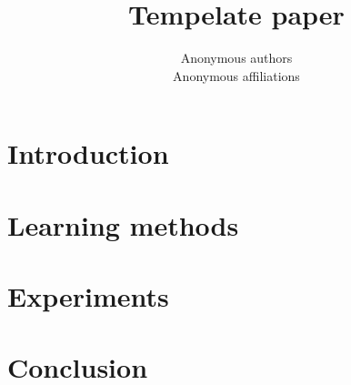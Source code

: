 \documentclass{article}
\title{Tempelate paper}
\author{%
	Anonymous authors \\
	Anonymous affiliations
}
\begin{document}
\maketitle

\begin{abstract}
\lipsum[1]
\end{abstract}

\section{Introduction}
\label{sec:intro}


\section{Learning methods}
\label{sec:method}


\section{Experiments}
\label{sec:exp}


\vspace{-.08in}
\section{Conclusion}

\lipsum[3]



\end{document}
